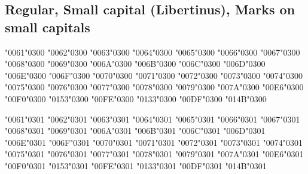 \newpage
\subsection*{Regular, Small capital (Libertinus), Marks on small capitals}

\textsc{\char"0061\char"0300} \textsc{\char"0062\char"0300} \textsc{\char"0063\char"0300} \textsc{\char"0064\char"0300} \textsc{\char"0065\char"0300} \textsc{\char"0066\char"0300} \textsc{\char"0067\char"0300} \textsc{\char"0068\char"0300} \textsc{\char"0069\char"0300} \textsc{\char"006A\char"0300} \textsc{\char"006B\char"0300} \textsc{\char"006C\char"0300} \textsc{\char"006D\char"0300} \textsc{\char"006E\char"0300} \textsc{\char"006F\char"0300} \textsc{\char"0070\char"0300} \textsc{\char"0071\char"0300} \textsc{\char"0072\char"0300} \textsc{\char"0073\char"0300} \textsc{\char"0074\char"0300} \textsc{\char"0075\char"0300} \textsc{\char"0076\char"0300} \textsc{\char"0077\char"0300} \textsc{\char"0078\char"0300} \textsc{\char"0079\char"0300} \textsc{\char"007A\char"0300} \textsc{\char"00E6\char"0300} \textsc{\char"00F0\char"0300} \textsc{\char"0153\char"0300} \textsc{\char"00FE\char"0300} \textsc{\char"0133\char"0300} \textsc{\char"00DF\char"0300} \textsc{\char"014B\char"0300}

\textsc{\char"0061\char"0301} \textsc{\char"0062\char"0301} \textsc{\char"0063\char"0301} \textsc{\char"0064\char"0301} \textsc{\char"0065\char"0301} \textsc{\char"0066\char"0301} \textsc{\char"0067\char"0301} \textsc{\char"0068\char"0301} \textsc{\char"0069\char"0301} \textsc{\char"006A\char"0301} \textsc{\char"006B\char"0301} \textsc{\char"006C\char"0301} \textsc{\char"006D\char"0301} \textsc{\char"006E\char"0301} \textsc{\char"006F\char"0301} \textsc{\char"0070\char"0301} \textsc{\char"0071\char"0301} \textsc{\char"0072\char"0301} \textsc{\char"0073\char"0301} \textsc{\char"0074\char"0301} \textsc{\char"0075\char"0301} \textsc{\char"0076\char"0301} \textsc{\char"0077\char"0301} \textsc{\char"0078\char"0301} \textsc{\char"0079\char"0301} \textsc{\char"007A\char"0301} \textsc{\char"00E6\char"0301} \textsc{\char"00F0\char"0301} \textsc{\char"0153\char"0301} \textsc{\char"00FE\char"0301} \textsc{\char"0133\char"0301} \textsc{\char"00DF\char"0301} \textsc{\char"014B\char"0301}

